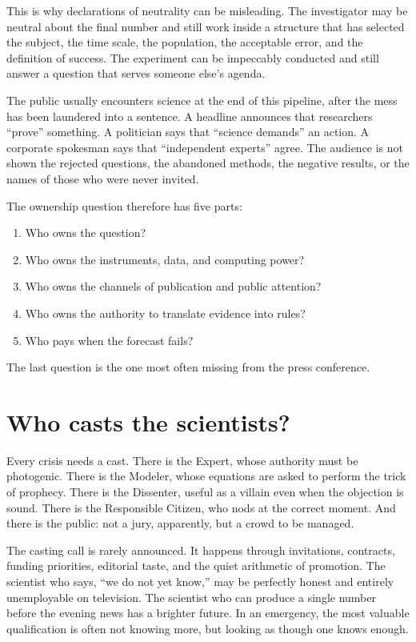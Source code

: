 ﻿\documentclass[12pt,a4paper]{book}
\begin{document}
This is why declarations of neutrality can be misleading. The investigator
may be neutral about the final number and still work inside a structure that
has selected the subject, the time scale, the population, the acceptable
error, and the definition of success. The experiment can be impeccably
conducted and still answer a question that serves someone else's agenda.

The public usually encounters science at the end of this pipeline, after the
mess has been laundered into a sentence. A headline announces that researchers
``prove'' something. A politician says that ``science demands'' an action. A
corporate spokesman says that ``independent experts'' agree. The audience is
not shown the rejected questions, the abandoned methods, the negative
results, or the names of those who were never invited.

The ownership question therefore has five parts:

\begin{enumerate}
\item Who owns the question?
\item Who owns the instruments, data, and computing power?
\item Who owns the channels of publication and public attention?
\item Who owns the authority to translate evidence into rules?
\item Who pays when the forecast fails?
\end{enumerate}

The last question is the one most often missing from the press conference.

\section{Who casts the scientists?}

Every crisis needs a cast. There is the Expert, whose authority must be
photogenic. There is the Modeler, whose equations are asked to perform the
trick of prophecy. There is the Dissenter, useful as a villain even when the
objection is sound. There is the Responsible Citizen, who nods at the correct
moment. And there is the public: not a jury, apparently, but a crowd to be
managed.

The casting call is rarely announced. It happens through invitations,
contracts, funding priorities, editorial taste, and the quiet arithmetic of
promotion. The scientist who says, ``we do not yet know,'' may be perfectly
honest and entirely unemployable on television. The scientist who can produce
a single number before the evening news has a brighter future. In an
emergency, the most valuable qualification is often not knowing more, but
looking as though one knows enough.
\end{document}
